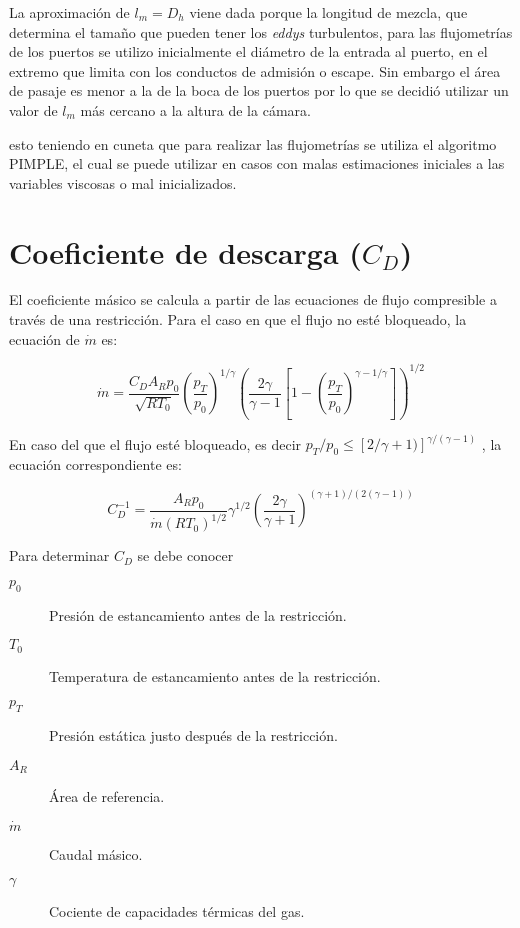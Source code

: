 La aproximación de $l_m = D_h$ viene dada porque la longitud de mezcla, que
determina el tamaño que pueden tener los \emph{eddys} turbulentos, para las
flujometrías de los puertos se utilizo inicialmente el diámetro de la entrada
al puerto, en el extremo que limita con los conductos de admisión o escape.
%
Sin embargo el área de pasaje es menor a la de la boca de los puertos por lo
que se decidió utilizar un valor de $l_m$ más cercano a la altura de la cámara.

esto teniendo en cuneta que para realizar las flujometrías se utiliza el
algoritmo PIMPLE, el cual se puede utilizar en casos con malas estimaciones
iniciales a las variables viscosas o mal inicializados.

\section{Coeficiente de descarga ($C_D$)}

El coeficiente másico se calcula a partir de las ecuaciones de flujo compresible
a través de una restricción.
%
Para el caso en que el flujo no esté bloqueado, la ecuación de $\dot{m}$ es:

\begin{equation}
    \label{eq:m_not_choked}
    \dot{m} = \frac{C_D A_R p_0}{\sqrt{R T_0}}
            {\left(\frac{p_T}{p_0} \right)}^{1/\gamma}
            {\left( \frac{2\gamma}{\gamma-1} \left[1- {(\frac{p_T}{p_0})}^{{\gamma-1}/\gamma} \right] \right)} ^{1/2}
\end{equation}

En caso del que el flujo esté bloqueado, es decir
$p_T/p_0 \le [2/\gamma+1)]^{\gamma/(\gamma - 1)}$
, la ecuación correspondiente es:

\begin{equation}
C_D^{-1} =  \frac {A_R p_0} {\dot{m} (R T_0)^{1/2}}
            \gamma^{1/2}
            \left( \frac{2\gamma}{\gamma+1} \right)^{(\gamma+1)/(2(\gamma-1))}
\end{equation}

Para determinar $C_D$ se debe conocer

\begin{description}
    \item[$p_0$] Presión de estancamiento antes de la restricción.
    \item[$T_0$] Temperatura de estancamiento antes de la restricción.
    \item[$p_T$] Presión estática justo después de la restricción.
    \item[$A_R$] Área de referencia.
    \item[$\dot{m}$] Caudal másico.
    \item[$\gamma$] Cociente de capacidades térmicas del gas.
\end{description}


